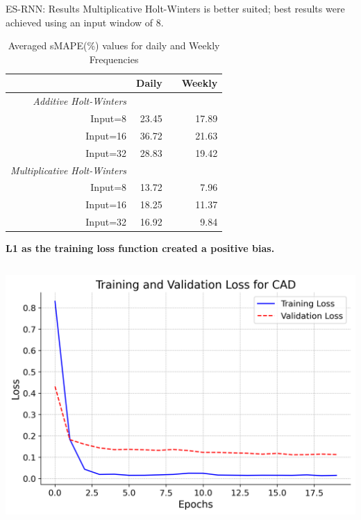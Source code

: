 \documentclass[aspectratio=169, 12pt]{beamer}
\newcommand{\ra}[1]{\renewcommand{\arraystretch}{#1}}
\begin{document}
\begin{frame}[allowframebreaks]{ES-RNN: Results}
Multiplicative Holt-Winters is better suited; best results were achieved using an input window of 8.
\begin{table}\centering
\ra{1.3}
\caption{Averaged sMAPE(\%) values for daily and Weekly Frequencies}
\begin{adjustbox}{width=0.35\textwidth}
\begin{tabular}{@{}rrcr@{}}\toprule
& Daily && Weekly\\
\midrule
\textit{Additive Holt-Winters} \\
Input=8 & 23.45 && 17.89\\
Input=16 & 36.72 && 21.63\\
Input=32 & 28.83 && 19.42\\
\textit{Multiplicative Holt-Winters} \\
Input=8 & 13.72 && 7.96\\
Input=16 & 18.25 && 11.37\\
Input=32 & 16.92 && 9.84\\
\bottomrule
\end{tabular}
\end{adjustbox}
\end{table}
\newpage
    \begin{center}
        \textbf{L1 as the training loss function created a positive bias.}
    \end{center}
\begin{columns}
    \begin{column}{0.25\textwidth}
        \includegraphics[width=\linewidth]{plots/CAD_loss_plot.png}
    \end{column}

\end{columns}
\end{frame}
\end{document}
